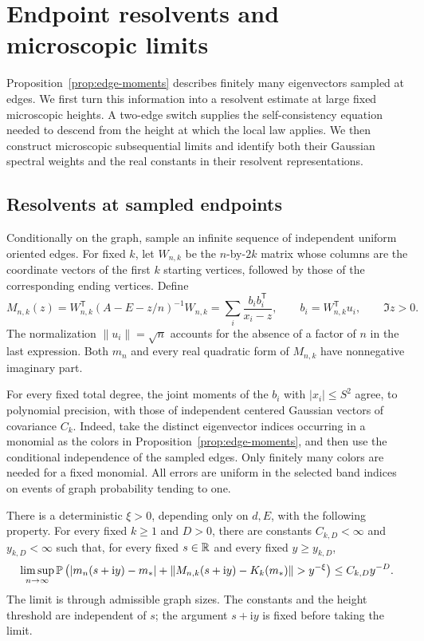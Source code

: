 \section{Endpoint resolvents and microscopic limits}\label{sec:limits}

Proposition~\ref{prop:edge-moments} describes finitely many eigenvectors
sampled at edges. We first turn this information into a resolvent estimate
at large fixed microscopic heights. A two-edge switch supplies the
self-consistency equation needed to descend from the height at which the
local law applies. We then construct microscopic subsequential limits and
identify both their Gaussian spectral weights and the real constants in
their resolvent representations.

\subsection{Resolvents at sampled endpoints}

Conditionally on the graph, sample an infinite sequence of independent
uniform oriented edges. For fixed \(k\), let \(W_{n,k}\) be the \(n\)-by-\(2k\)
matrix whose columns are the coordinate vectors of the first \(k\)
starting vertices, followed by those of the corresponding ending
vertices. Define
\begin{equation}\label{eq:lim-endpoint-resolvent}
 M_{n,k}(z)
 =W_{n,k}^{\mathsf T}(A-E-z/n)^{-1}W_{n,k}
 =\sum_i\frac{b_i b_i^{\mathsf T}}{x_i-z},
 \qquad b_i=W_{n,k}^{\mathsf T}u_i,\qquad \Im z>0.
\end{equation}
The normalization \(\|u_i\|=\sqrt n\) accounts for the absence of a factor
of \(n\) in the last expression. Both \(m_n\) and every real quadratic
form of \(M_{n,k}\) have nonnegative imaginary part.

For every fixed total degree, the joint moments of the \(b_i\) with
\(|x_i|\le S^2\) agree, to polynomial precision, with those of independent
centered Gaussian vectors of covariance \(C_k\). Indeed, take the distinct
eigenvector indices occurring in a monomial as the colors in
Proposition~\ref{prop:edge-moments}, and then use the conditional
independence of the sampled edges. Only finitely many colors are needed
for a fixed monomial. All errors are uniform in the selected band
indices on events of graph probability tending to one.

\begin{proposition}\label{prop:endpoint-control}
There is a deterministic \(\xi>0\), depending only on \(d,E\), with the
following property. For every fixed \(k\ge1\) and \(D>0\), there are
constants \(C_{k,D}<\infty\) and \(y_{k,D}<\infty\) such that, for every
fixed \(s\in\mathbb R\) and every fixed \(y\ge y_{k,D}\),
\begin{equation}\label{eq:lim-endpoint-control}
 \limsup_{n\to\infty}
 \PP\left(
 |m_n(s+\mathrm i y)-m_*|
 +\|M_{n,k}(s+\mathrm i y)-K_k(m_*)\|>y^{-\xi}
 \right)
 \le C_{k,D}y^{-D}.
\end{equation}
The limit is through admissible graph sizes. The constants and the height
threshold are independent of \(s\); the argument \(s+\mathrm i y\) is
fixed before taking the limit.
\end{proposition}

